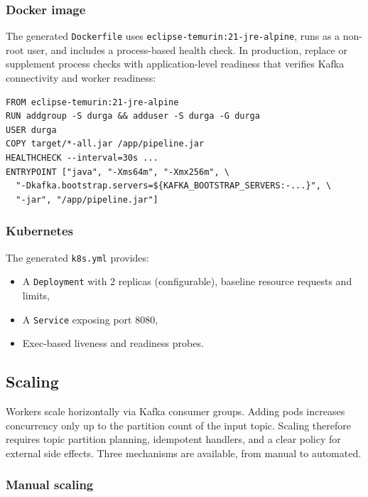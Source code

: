 \subsubsection{Docker image}

The generated \texttt{Dockerfile} uses \texttt{eclipse-temurin:21-jre-alpine},
runs as a non-root user, and includes a process-based health check. In
production, replace or supplement process checks with application-level
readiness that verifies Kafka connectivity and worker readiness:

\begin{verbatim}
FROM eclipse-temurin:21-jre-alpine
RUN addgroup -S durga && adduser -S durga -G durga
USER durga
COPY target/*-all.jar /app/pipeline.jar
HEALTHCHECK --interval=30s ...
ENTRYPOINT ["java", "-Xms64m", "-Xmx256m", \
  "-Dkafka.bootstrap.servers=${KAFKA_BOOTSTRAP_SERVERS:-...}", \
  "-jar", "/app/pipeline.jar"]
\end{verbatim}

\subsubsection{Kubernetes}

The generated \texttt{k8s.yml} provides:

\begin{itemize}
\item A \texttt{Deployment} with 2 replicas (configurable), baseline resource
  requests and limits,
\item A \texttt{Service} exposing port 8080,
\item Exec-based liveness and readiness probes.
\end{itemize}

\subsection{Scaling}

Workers scale horizontally via Kafka consumer groups. Adding pods increases
concurrency only up to the partition count of the input topic. Scaling therefore
requires topic partition planning, idempotent handlers, and a clear policy for
external side effects. Three mechanisms are available, from manual to automated.

\subsubsection{Manual scaling}

